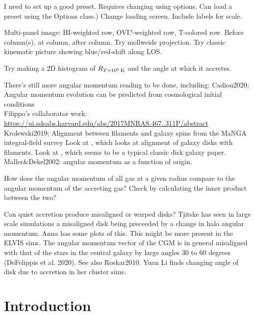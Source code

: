 \documentclass[fleqn,usenatbib]{mnras}
\newcommand{\Rcon}{R_{T=10^5\,{\rm K}}}
\begin{document}
I need to set up a good preset. Requires changing using options. Can load a preset using the Options class.)
Change loading screen.
Include labels for scale.

Multi-panel image:
HI-weighted row,
OVI?-weighted row,
T-colored row.
Before column(s), at column, after column.
Try mollweide projection.
Try classic kinematic picture showing blue/red-shift along LOS.

Try making a 2D histogram of $\Rcon$ and the angle at which it accretes.

There's still more angular momentum reading to be done, including:
Cadiou2020; Angular momentum evolution can be predicted from cosmological initial conditions\\
Filippo's collaborator work: \url{https://ui.adsabs.harvard.edu/abs/2017MNRAS.467..311P/abstract}\\
Krolewski2019; Alignment between filaments and galaxy spins from the {MaNGA} integral-field survey
Look at \cite{Bird2019}, which looks at alignment of galaxy disks with filaments.
Look at \cite{Bird2020}, which seems to be a typical classic disk galaxy paper.
Maller\&Dekel2002: angular momentum as a function of origin.

How does the angular momentum of all gas at a given radius compare to the angular momentum of the accreting gas?
Check by calculating the inner product between the two?

Can quiet accretion produce misaligned or warped disks?
Tjitske has seen in large scale simulations a misaligned disk being preceeded by a change in halo angular momentum.
Anna has some plots of this. This might be more present in the ELVIS sims.
The angular momentum vector of the CGM is in general misaligned with that of the stars in the central galaxy by large angles  30 to 60 degrees (DeFelippis et al. 2020).
See also Roskar2010.
Yuan Li finds changing angle of disk due to accretion in her cluster sims.

\section{Introduction}
\label{s: introduction}
\end{document}
